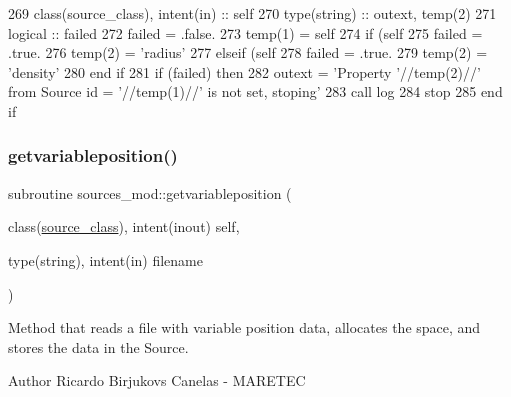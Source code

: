 \begin{DoxyCode}
269     \textcolor{keywordtype}{class}(source\_class), \textcolor{keywordtype}{intent(in)} :: self
270     \textcolor{keywordtype}{type}(string) :: outext, temp(2)
271     \textcolor{keywordtype}{logical} :: failed
272     failed = .false.
273     temp(1) = self%
274     \textcolor{keywordflow}{if} (self%
275         failed = .true.
276         temp(2) = \textcolor{stringliteral}{'radius'}
277     \textcolor{keywordflow}{elseif} (self%
278         failed = .true.
279         temp(2) = \textcolor{stringliteral}{'density'}
280 \textcolor{keywordflow}{    end if}
281     \textcolor{keywordflow}{if} (failed) \textcolor{keywordflow}{then}
282         outext = \textcolor{stringliteral}{'Property '}//temp(2)//\textcolor{stringliteral}{' from Source id = '}//temp(1)//\textcolor{stringliteral}{' is not set, stoping'}
283         \textcolor{keyword}{call }log%
284         stop
285 \textcolor{keywordflow}{    end if}
\end{DoxyCode}
\mbox{\label{namespacesources__mod_a1d419dd3048cff4cba05de4dd05b6556}} 
\subsubsection{\texorpdfstring{getvariableposition()}{getvariableposition()}}
{\footnotesize\ttfamily subroutine sources\+\_\+mod\+::getvariableposition (\begin{DoxyParamCaption}\item[{class(\mbox{\hyperlink{structsources__mod_1_1source__class}{source\+\_\+class}}), intent(inout)}]{self,  }\item[{type(string), intent(in)}]{filename }\end{DoxyParamCaption})\hspace{0.3cm}{\ttfamily [private]}}



Method that reads a file with variable position data, allocates the space, and stores the data in the Source. 

\begin{DoxyAuthor}{Author}
Ricardo Birjukovs Canelas -\/ M\+A\+R\+E\+T\+EC 
\end{DoxyAuthor}


